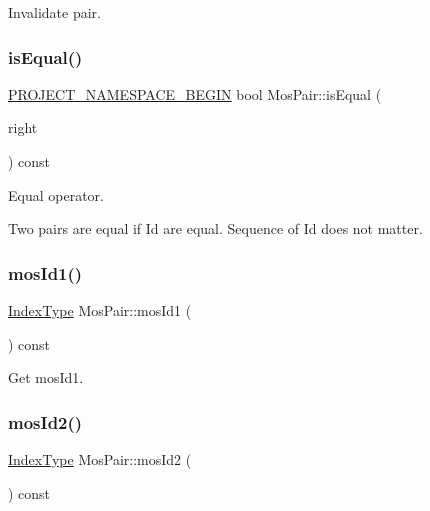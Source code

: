 Invalidate pair. 

\mbox{\label{classMosPair_a4e4d694485bcc5c7c14981abef32774c}} 
\subsubsection{\texorpdfstring{is\+Equal()}{isEqual()}}
{\footnotesize\ttfamily \hyperlink{namespace_8h_ae48726a24dab2034454cf6d79e531eb8}{P\+R\+O\+J\+E\+C\+T\+\_\+\+N\+A\+M\+E\+S\+P\+A\+C\+E\+\_\+\+B\+E\+G\+IN} bool Mos\+Pair\+::is\+Equal (\begin{DoxyParamCaption}\item[{const \hyperlink{classMosPair}{Mos\+Pair} \&}]{right }\end{DoxyParamCaption}) const}



Equal operator. 

Two pairs are equal if Id are equal. Sequence of Id does not matter. \mbox{\label{classMosPair_a324d89c99656159e6882e6f9701f0efe}} 
\subsubsection{\texorpdfstring{mos\+Id1()}{mosId1()}}
{\footnotesize\ttfamily \hyperlink{type_8h_a581e8093e28e7362f2b6937296190676}{Index\+Type} Mos\+Pair\+::mos\+Id1 (\begin{DoxyParamCaption}{ }\end{DoxyParamCaption}) const\hspace{0.3cm}{\ttfamily [inline]}}



Get mos\+Id1. 

\mbox{\label{classMosPair_a08f2d371ecad665d546bef76c45e2665}} 
\subsubsection{\texorpdfstring{mos\+Id2()}{mosId2()}}
{\footnotesize\ttfamily \hyperlink{type_8h_a581e8093e28e7362f2b6937296190676}{Index\+Type} Mos\+Pair\+::mos\+Id2 (\begin{DoxyParamCaption}{ }\end{DoxyParamCaption}) const\hspace{0.3cm}{\ttfamily [inline]}}



